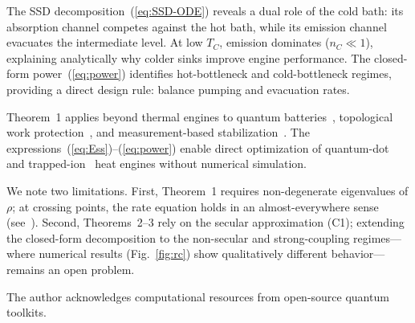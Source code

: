 \documentclass[prl,twocolumn,superscriptaddress,amsmath,amssymb]{revtex4-2}
\begin{document}
The SSD decomposition~(\ref{eq:SSD-ODE}) reveals a dual role of the cold bath: its absorption channel competes against the hot bath, while its emission channel evacuates the intermediate level. At low $T_C$, emission dominates ($n_C \ll 1$), explaining analytically why colder sinks improve engine performance. The closed-form power~(\ref{eq:power}) identifies hot-bottleneck and cold-bottleneck regimes, providing a direct design rule: balance pumping and evacuation rates.

Theorem~1 applies beyond thermal engines to quantum batteries~\cite{Ahmadi2025}, topological work protection~\cite{Lu2025}, and measurement-based stabilization~\cite{Malavazi2025}. The expressions~(\ref{eq:Ess})--(\ref{eq:power}) enable direct optimization of quantum-dot~\cite{Josefsson2018} and trapped-ion~\cite{vonLindenfels2019} heat engines without numerical simulation.

We note two limitations. First, Theorem~1 requires non-degenerate eigenvalues of $\rho$; at crossing points, the rate equation holds in an almost-everywhere sense (see~\cite{SM}). Second, Theorems~2--3 rely on the secular approximation (C1); extending the closed-form decomposition to the non-secular and strong-coupling regimes---where numerical results (Fig.~\ref{fig:rc}) show qualitatively different behavior---remains an open problem.

\begin{acknowledgments}
The author acknowledges computational resources from open-source quantum toolkits.
\end{acknowledgments}


\end{document}
